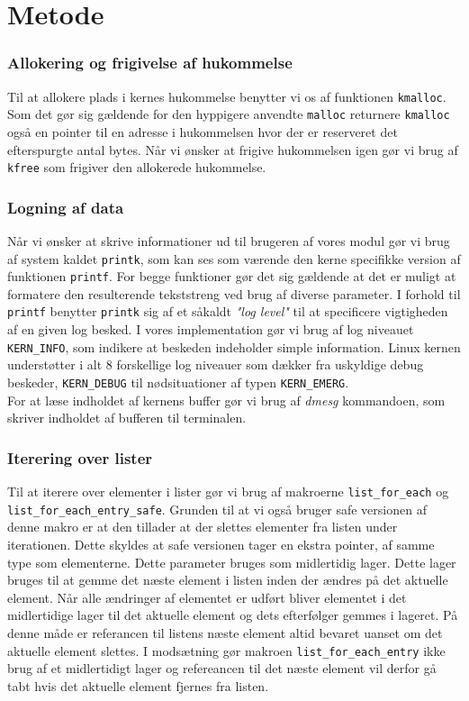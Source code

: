 \documentclass[main.tex]{subfile}
\begin{document}
\section{Metode}
\subsubsection*{Allokering og frigivelse af hukommelse}
Til at allokere plads i kernes hukommelse benytter vi os af funktionen \texttt{kmalloc}. Som det gør sig gældende for den hyppigere anvendte \texttt{malloc} returnere \texttt{kmalloc} også en pointer til en adresse i hukommelsen hvor der er reserveret det efterspurgte antal bytes. Når vi ønsker at frigive hukommelsen igen gør vi brug af \texttt{kfree} som frigiver den allokerede hukommelse.

\subsubsection*{Logning af data}
Når vi ønsker at skrive informationer ud til brugeren af vores modul gør vi brug af system kaldet \texttt{printk}, som kan ses som værende den kerne specifikke version af funktionen \texttt{printf}. For begge funktioner gør det sig gældende at det er muligt at formatere den resulterende tekststreng ved brug af diverse parameter. I forhold til \texttt{printf} benytter \texttt{printk} sig af et såkaldt \emph{"log level"} til at specificere vigtigheden af en given log besked. I vores implementation gør vi brug af log niveauet \texttt{KERN\_INFO}, som indikere at beskeden indeholder simple information. Linux kernen understøtter i alt 8 forskellige log niveauer som dækker fra uskyldige debug beskeder, \texttt{KERN\_DEBUG} til nødsituationer af typen \texttt{KERN\_EMERG}.\\

For at læse indholdet af kernens buffer gør vi brug af \emph{dmesg} kommandoen, som skriver indholdet af bufferen til terminalen. 

\subsubsection*{Iterering over lister}
Til at iterere over elementer i lister gør vi brug af makroerne \texttt{list\_for\_each} og \texttt{list\_for\_each\_entry\_safe}. Grunden til at vi også bruger safe versionen af denne makro er at den tillader at der slettes elementer fra listen under iterationen. Dette skyldes at safe versionen tager en ekstra pointer, af samme type som elementerne. Dette parameter bruges som midlertidig lager. Dette lager bruges til at gemme det næste element i listen inden der ændres på det aktuelle element. Når alle ændringer af elementet er udført bliver elementet i det midlertidige lager til det aktuelle element og dets efterfølger gemmes i lageret. På denne måde er referancen til listens næste element altid bevaret uanset om det aktuelle element slettes. I modsætning gør makroen \texttt{list\_for\_each\_entry} ikke brug af et midlertidigt lager og refereancen til det næste element vil derfor gå tabt hvis det aktuelle element fjernes fra listen.
\end{document}
